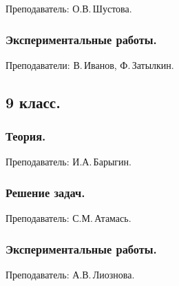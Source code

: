 \documentclass[12pt,a4paper,oneside]{scrartcl}
\newcounter{notask}
\newlength{\h}
\newlength{\x}
\begin{document}
\textsf{Преподаватель: О.В.\,Шустова.}
\smallskip
\parindent=0mm






\setcounter{notask}{1}
\parindent=5mm

\subsubsection{Экспериментальные работы.}
\label{sec:daily_8_exp}

\textsf{Преподаватели: В.\,Иванов, Ф.\,Затылкин.}



\subsection{9 класс.}
\label{sec:daily_9}

\subsubsection{Теория.}
\label{sec:daily_9_th}

\textsf{Преподаватель: И.А.\,Барыгин.}
\smallskip



\subsubsection{Решение задач.}
\label{sec:daily_9_problems}

\textsf{Преподаватель: С.М.\,Атамась.}
\smallskip
\parindent=0mm








\setcounter{notask}{1}
\parindent=5mm

\subsubsection{Экспериментальные работы.}
\label{sec:daily_9_exp}

\textsf{Преподаватель: А.В.\,Лиознова.}


\end{document}
